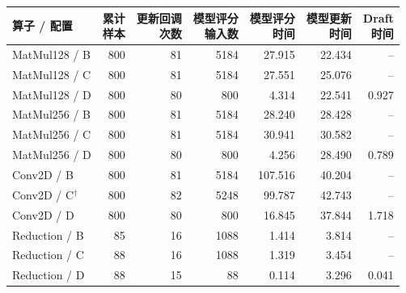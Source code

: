 \begin{tabular*}{\textwidth}{@{\extracolsep{\fill}}lrrrrrr@{}}
\toprule
算子 / 配置 & \shortstack{累计\\样本} & \shortstack{更新回调\\次数} & \shortstack{模型评分\\输入数} & \shortstack{模型评分\\时间} & \shortstack{模型更新\\时间} & \shortstack{Draft\\时间} \\
\midrule
MatMul128 / B & 800 & 81 & 5184 & 27.915 & 22.434 & -- \\
MatMul128 / C & 800 & 81 & 5184 & 27.551 & 25.076 & -- \\
MatMul128 / D & 800 & 80 & 800 & 4.314 & 22.541 & 0.927 \\
\midrule
MatMul256 / B & 800 & 81 & 5184 & 28.240 & 28.428 & -- \\
MatMul256 / C & 800 & 81 & 5184 & 30.941 & 30.582 & -- \\
MatMul256 / D & 800 & 80 & 800 & 4.256 & 28.490 & 0.789 \\
\midrule
Conv2D / B & 800 & 81 & 5184 & 107.516 & 40.204 & -- \\
Conv2D / C$^{\dagger}$ & 800 & 82 & 5248 & 99.787 & 42.743 & -- \\
Conv2D / D & 800 & 80 & 800 & 16.845 & 37.844 & 1.718 \\
\midrule
Reduction / B & 85 & 16 & 1088 & 1.414 & 3.814 & -- \\
Reduction / C & 88 & 16 & 1088 & 1.319 & 3.454 & -- \\
Reduction / D & 88 & 15 & 88 & 0.114 & 3.296 & 0.041 \\
\bottomrule
\end{tabular*}
